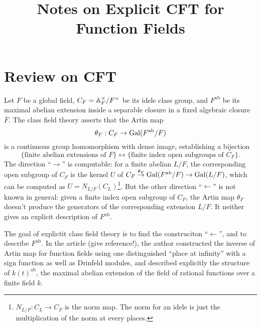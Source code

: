 \documentclass{article}
\title{Notes on Explicit CFT for Function Fields}
\newcommand{\ab}{\mathrm{ab}}
\begin{document}
\maketitle

\section{Review on CFT}
Let $F$ be a global field, $C_F = \mathbb{A}_F^\times/F^\times$ be its idele class group, and $F^\ab$ be its maximal abelian extension inside a separable closure in a fixed algebraic closure $\bar F$.
The class field theory asserts that the Artin map
\[\theta_F : C_F\to\gal(F^\ab/F)\]
is a continuous group homomorphism with dense image,
establishing a bijection
\[\{\text{finite abelian extensions of }F\}\longleftrightarrow \{\text{finite index open subgroups of }C_F\}.\]
The direction ``$\to$'' is computable: for a finite abelian $L/F$,
the corresponding open subgroup of $C_F$ is the kernel $U$ of $C_F\stackrel{\theta_F}{\to}\gal(F^\ab/F)\to\gal(L/F)$,
which can be computed as $U = N_{L/F}(C_L)$\footnote{$N_{L/F} : C_L\to C_F$ is the norm map.
    The norm for an idele is just the multiplication of the norm at every places.}.
But the other direction ``$\gets$'' is not known in general:
given a finite index open subgroup of $C_F$,
the Artin map $\theta_F$ doesn't produce the generators of the corresponding extension $L/F$.
It neither gives an explicit description of $F^\ab$.

The goal of explictit class field theory is to find the construciton ``$\gets$'', and to describe $F^\ab$.
In the article (give reference!), the author constructed the inverse of Artin map for function fields using one distinguished ``place at infinity'' with a sign function as well as Drinfeld modules,
and described explicitly the structure of $k(t)^\ab$, the maximal abelian extension of the field of rational functions over a finite field $k$.
\end{document}
